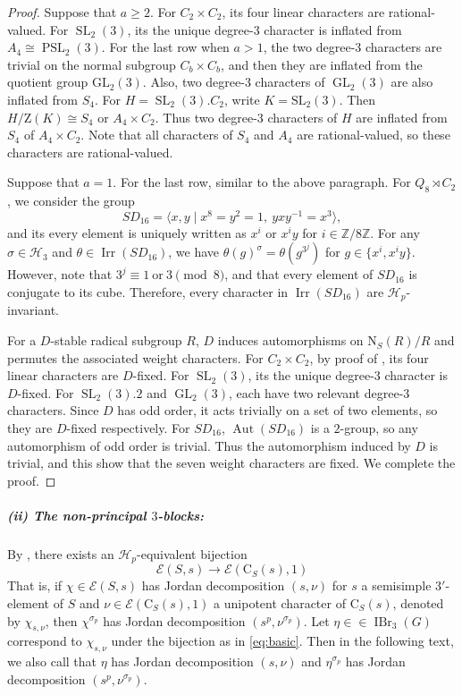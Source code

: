 \documentclass[11pt,a4paper]{article}
\numberwithin{equation}{section}
\theoremstyle{definition}
\theoremstyle{remark}
\newcommand{\Irr}{\operatorname{Irr}}
\newcommand{\IBr}{\operatorname{IBr}}
\newcommand{\Aut}{\operatorname{Aut}}
\newcommand{\GL}{\operatorname{GL}}
\newcommand{\SL}{\operatorname{SL}}
\DeclareMathOperator{\PSL}{PSL}
\newcommand{\ZZ}{\mathrm{Z}}
\newcommand{\HH}{\mathcal H}
\newcommand{\NN}{\mathrm N}
\newcommand{\CC}{\mathrm C}
\begin{document}
\begin{proof}
Suppose that  $a\geq2$. For $C_2\times C_2$, its four linear characters are rational-valued. For $\SL_2(3)$, its the unique degree-$3$ character is inflated from $A_4\cong \PSL_2(3)$. For the last
row when $a>1$, the two degree-$3$ characters are trivial on the normal subgroup \(C_b\times C_b\), and then they are inflated from the quotient group \(\mathrm{GL}_2(3)\).
Also, two degree-$3$ characters of $ \GL_2(3)$ are also  inflated from $S_4$.
For \(H=\SL_2(3).C_2\), write $K=\mathrm{SL}_2(3)$.
Then $H/\ZZ(K)\cong S_4$ or $A_4\times C_2$. Thus two degree-$3$ characters of $H$ are inflated from $S_4$ of $A_4\times C_2$. Note that all characters of $S_4$ and $A_4$ are rational-valued, so these characters are rational-valued.

Suppose that $a=1$. For the last row, similar to the above paragraph. For $Q_8\rtimes C_2$, we consider the group 
\[
SD_{16}=\langle x,y\mid x^8=y^2=1,\ yxy^{-1}=x^3\rangle,
\]
and its every element is uniquely written as \(x^i\) or \(x^iy\) for \(i\in{\mathbb Z}/8{\mathbb Z}\).
For any $\sigma\in\HH_3$ and $\theta\in \Irr(SD_{16})$, we have $\theta(g)^\sigma=\theta(g^{3^j})$ for $g\in\{x^i,x^iy\}$. However, note that $3^j\equiv1\ \text{or}\ 3\pmod8$, and that every element of $SD_{16}$ is conjugate to its cube. Therefore,  every character in $\Irr(SD_{16})$
are $\HH_p$-invariant.

For a $D$-stable radical subgroup $R$, $D$ induces automorphisms on $\NN_S(R)/R$ and permutes the associated weight characters. For $C_2\times C_2$, by proof of \cite{Malle}, its four linear characters are $D$-fixed. 
For \(\SL_2(3)\), its the unique degree-$3$ character is $D$-fixed. For \(\SL_2(3).2\) and \(\GL_2(3)\), each have two relevant degree-$3$ characters. Since $D$ has odd order, it acts trivially on a set of two elements, so they are $D$-fixed respectively. For \(SD_{16}\), $\Aut(SD_{16})$ is a \(2\)-group, so any automorphism of odd order is trivial. Thus the automorphism induced by \(D\) is trivial, and this show that the seven weight characters are fixed. We complete the proof.
\end{proof}



\subparagraph{(ii) The non-principal $3$-blocks:}
By \cite[Theorem  B]{Johansson}, there exists an $\HH_p$-equivalent bijection
\[
\mathcal{E}(S,s)\longrightarrow \mathcal{E}(\CC_S(s),1)
\]
That is, if $\chi\in\mathcal{E}(S,s)$ has 
Jordan decomposition $(s,\nu)$ for $s$ a semisimple $3'$-element of $S$ and $\nu\in\mathcal{E}(\CC_S(s),1)$ a unipotent character of $\CC_S(s)$, denoted by  $\chi_{s,\nu}$,  then $\chi^{\sigma_p}$ has Jordan  decomposition $(s^p, \nu^{\sigma_p})$. 
Let $\eta\in\in\IBr_3(G)$ correspond to $\chi_{s,\nu}$ under the bijection as in \eqref{eq:basic}. Then in the following text, we also call that $\eta$ has Jordan  decomposition $(s,\nu)$ and $\eta^{\sigma_p}$ has Jordan  decomposition $(s^p,\nu^{\sigma_p})$.
\end{document}

